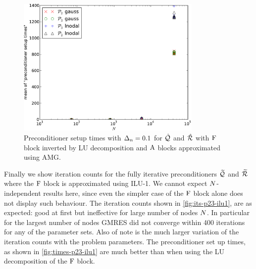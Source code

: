 \begin{figure}
  \centering
  \includegraphics[width=0.8\textwidth]{plots/linear_solvers_p2p3/implicitexact-meanofpreconditionersetuptimesvsinitialnnode.pdf}
  \caption{Preconditioner setup times with $\Delta_{n}=0.1$ for $\hat{\mathcal{Q}}$ and $\hat{\mathcal{R}}$ with $\mathrm{F}$ block inverted by LU decomposition and $\mathrm{A}$ blocks approximated using AMG.}
  \label{fig:times-p23-exact}
\end{figure}


Finally we show iteration counts for the fully iterative preconditioners $\widetilde{\mathcal{Q}}$ and $\widetilde{\mathcal{R}}$ where the $\mathrm{F}$ block is approximated using ILU-1.
We cannot expect $N$-independent results here, since even the simpler case of the $\mathrm{F}$ block alone does not display such behaviour.
The iteration counts shown in \cref{fig:its-p23-ilu1}, are as expected: good at first but ineffective for large number of nodes $N$.
In particular for the largest number of nodes GMRES did not converge within 400 iterations for any of the parameter sets.
Also of note is the much larger variation of the iteration counts with the problem parameters.
The preconditioner set up times, as shown in \cref{fig:times-p23-ilu1} are much better than when using the LU decomposition of the $\mathrm{F}$ block.

